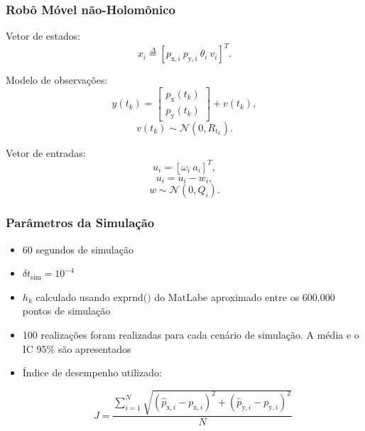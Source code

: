 \documentclass{beamer}
\begin{document}
\begin{frame}
	\frametitle{Robô Móvel não-Holomônico}
	
	Vetor de estados:
	\begin{equation*}
	x_i \overset{\Delta}{=} [p_{\textrm{x},i}\ p_{\textrm{y},i}\ \theta_i\ v_i]^T.
	\end{equation*}
	
	\vspace{0.25cm}
	Modelo de observações:
	\begin{equation*}
	y(t_k) = 
	\begin{bmatrix}
	p_{\textrm{x}}(t_k) \\
	p_{\textrm{y}}(t_k)
	\end{bmatrix}+v(t_k),
	\end{equation*}
	\begin{equation*}
	v(t_k) \sim \mathcal{N} (0,R_{t_k}).
	\end{equation*}
	
	\vspace{0.25cm}
	Vetor de entradas:
	\begin{equation*}
	u_i = [\omega_i\ a_i]^T,
	\end{equation*}
	\begin{equation*}
	u_i = \tilde{u}_i - w_i,
	\end{equation*}
	\begin{equation*}
	w \sim \mathcal{N} (0, Q_i).
	\end{equation*}


\end{frame}


\begin{frame}
\frametitle{Parâmetros da Simulação}

\begin{itemize}
	\item 60 segundos de simulação
	\vspace{0.25cm}
	\item $\delta t_{\textrm{sim}} = 10^{-4}$
	\vspace{0.25cm}
	\item $h_k$ calculado usando $\textrm{exprnd()}$ do MatLab\texttrademark e aproximado entre os 600.000 pontos de simulação
	\vspace{0.25cm}
	\item 100 realizações foram realizadas para cada cenário de simulação. A média e o IC 95\% são apresentados
	\vspace{0.25cm}
	\item Índice de desempenho utilizado:
	
	\begin{equation*}
	J = \frac{ \sum_{i=1}^N \sqrt{(\hat{p}_{\textrm{x},i}-p_{\textrm{x},i})^2+(\hat{p}_{\textrm{y},i}-p_{\textrm{y},i})^2}}{N}
	\end{equation*}
	
\end{itemize}

\end{frame}
\end{document}
